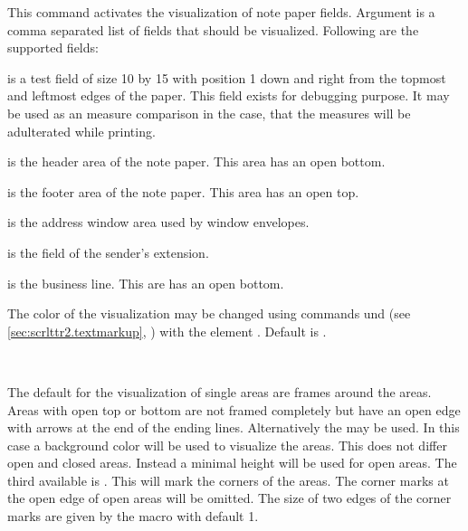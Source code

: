 \begin{Declaration}
\end{Declaration}
%
This command activates the visualization of note paper fields. Argument
 is a comma separated list of fields that should be
visualized. Following are the supported fields:
\begin{labeling}[~--]{}
\item[\PValue{test}] is a test field of size 10 by 15 with
  position 1 down and right from the topmost and leftmost edges of
  the paper. This field exists for debugging purpose. It may be used as an
  measure comparison in the case, that the measures will be adulterated while
  printing.
\item[\PValue{head}] is the header area of the note paper. This area has an
  open bottom.
\item[\PValue{foot}] is the footer area of the note paper. This area has an
  open top.
\item[\PValue{address}] is the address window area used by window envelopes.
\item[\PValue{location}] is the field of the sender's extension.
\item[\PValue{refline}] is the business line. This are has an open bottom.
\end{labeling}%
%
The color of the visualization may be changed using
commands und  (see
\autoref{sec:scrlttr2.textmarkup},
) with the element
. Default is
.%
%
%
%

\begin{Declaration}
  \\
\end{Declaration}
%
The default for the visualization of single areas are
frames around the areas. Areas with open top or
bottom are not framed completely but have an open edge with arrows at the end
of the ending lines. Alternatively the
  may be used. In this case a
background color will be used to visualize the areas. This does not differ open
and closed areas. Instead a minimal height will be used for open areas. The
third available  is
. This will mark the corners of the areas. The corner marks at
the open edge of open areas will be omitted. The size of two edges of the
corner marks are given by the macro  with default 1.%
%
%


